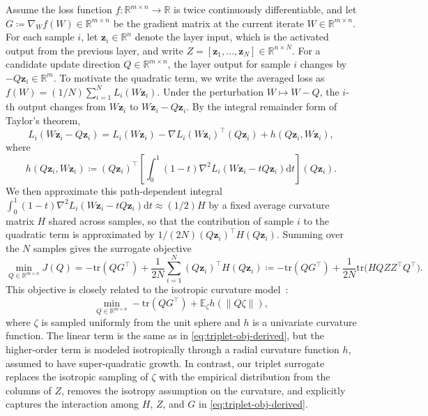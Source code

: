 \documentclass[11pt]{article}
\newcommand{\R}{\mathbb{R}}
\begin{document}
Assume the loss function $f:\R^{m\times n}\to\R$ is twice continuously differentiable, and let ${G} \coloneqq \nabla_{{W}} f({W})\in\R^{m\times n}$ be the gradient matrix at the current iterate ${W}\in\R^{m\times n}$. For each sample $i$, let $\boldsymbol{z}_i\in\R^n$ denote the layer input, which is the activated output from the previous layer, and write ${Z}=[\boldsymbol{z}_1,\dots,\boldsymbol{z}_N]\in\R^{n\times N}$. For a candidate update direction ${Q}\in\R^{m\times n}$, the layer output for sample $i$ changes by $-{Q}\boldsymbol{z}_i\in\R^m$. To motivate the quadratic term, we write the averaged loss as $f({W})=(1/N)\sum_{i=1}^N L_i({W}\boldsymbol{z}_i)$. Under the perturbation ${W}\mapsto {W}-{Q}$, the $i$-th output changes from ${W}\boldsymbol{z}_i$ to ${W}\boldsymbol{z}_i-{Q}\boldsymbol{z}_i$. By the integral remainder form of Taylor's theorem,
\[
L_i({W}\boldsymbol{z}_i-{Q}\boldsymbol{z}_i)
=
L_i({W}\boldsymbol{z}_i)
-
\nabla L_i({W}\boldsymbol{z}_i)^\top ({Q}\boldsymbol{z}_i)
+
h({Q}\boldsymbol{z}_i,{W}\boldsymbol{z}_i),
\]
where
\[
h({Q}\boldsymbol{z}_i,{W}\boldsymbol{z}_i)
 \coloneqq 
({Q}\boldsymbol{z}_i)^\top
\left[
\int_0^1 (1-t) \nabla^2 L_i({W}\boldsymbol{z}_i-t {Q}\boldsymbol{z}_i) \mathrm{d}t
\right]
({Q}\boldsymbol{z}_i).
\]
We then approximate this path-dependent integral \( \int_0^1 (1-t)\nabla^2 L_i({W}\boldsymbol{z}_i-t {Q}\boldsymbol{z}_i) \mathrm{d}t \approx (1/2) H \) by a fixed average curvature matrix $H$ shared across samples, so that the contribution of sample $i$ to the quadratic term is approximated by $1/(2N)({Q}\boldsymbol{z}_i)^\top {H} ({Q}\boldsymbol{z}_i)$. Summing over the $N$ samples gives the surrogate objective
\begin{equation}\label{eq:triplet-obj-derived}
  \min_{{Q}\in\R^{m\times n}} J({Q}) =  - \mathrm{tr}({Q}{G}^\top)
+ \frac1{2N}\sum_{i=1}^N ({Q}\boldsymbol{z}_i)^\top {H} ({Q}\boldsymbol{z}_i) \coloneqq - \mathrm{tr}({Q}{G}^\top) + \frac1{2N}\mathrm{tr}\Big(HQZZ^\top Q^\top\Big).
\end{equation}
This objective is closely related to the isotropic curvature model~\citep{su2025isotropic}:
\[
\min_{{Q}\in\R^{m\times n}} -\mathrm{tr}(QG^\top) + \mathbb{E}_{\zeta} h(\|Q\zeta\|),
\]
where $\zeta$ is sampled uniformly from the unit sphere and $h$ is a univariate curvature function. The linear term is the same as in \eqref{eq:triplet-obj-derived}, but the higher-order term is modeled isotropically through a radial curvature function $h$, assumed to have super-quadratic growth. In contrast, our triplet surrogate replaces the isotropic sampling of $\zeta$ with the empirical distribution from the columns of $Z$, removes the isotropy assumption on the curvature, and explicitly captures the interaction among $H$, $Z$, and $G$ in \eqref{eq:triplet-obj-derived}.
\end{document}
